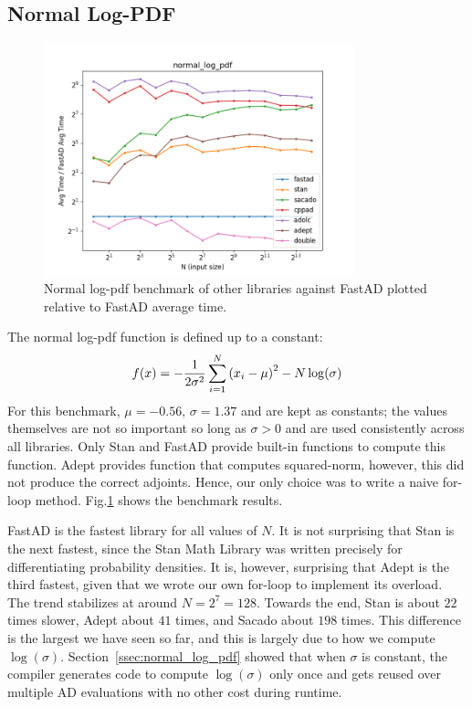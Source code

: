 \subsection{Normal Log-PDF}

\begin{figure}[t]
    \centering
    \includegraphics[width=0.8\textwidth]{figs/normal_log_pdf_fig.png}
    \caption{%
        Normal log-pdf benchmark of other libraries against FastAD 
        plotted relative to FastAD average time.
    }\label{fig:normal_log_pdf}
\end{figure}

The normal log-pdf function is defined up to a constant:
\[
    f(x) = -\frac{1}{2\sigma^2} \sum\limits_{i=1}^N \left(x_i - \mu\right)^2 
           -N\log(\sigma)
\]
For this benchmark, $\mu = -0.56,\,\sigma = 1.37$ and are kept as constants;
the values themselves are not so important so long as $\sigma > 0$
and are used consistently across all libraries.
Only Stan and FastAD provide built-in functions to compute this function.
Adept provides  function that computes squared-norm,
however, this did not produce the correct adjoints.
Hence, our only choice was to write a naive for-loop method.
Fig.\ref{fig:normal_log_pdf} shows the benchmark results.

FastAD is the fastest library for all values of $N$.
It is not surprising that Stan is the next fastest, 
since the Stan Math Library was written precisely for differentiating probability densities.
It is, however, surprising that Adept is the third fastest,
given that we wrote our own for-loop to implement its overload.
The trend stabilizes at around $N=2^{7}=128$.
Towards the end,
Stan is about $ 22$ times slower,
Adept about $ 41$ times,
and Sacado about $ 198$ times.
This difference is the largest we have seen so far,
and this is largely due to how we compute $\log(\sigma)$.
Section~\ref{ssec:normal_log_pdf} showed that when $\sigma$ is constant,
the compiler generates code to compute $\log(\sigma)$ only once
and gets reused over multiple AD evaluations with no other cost during runtime.
